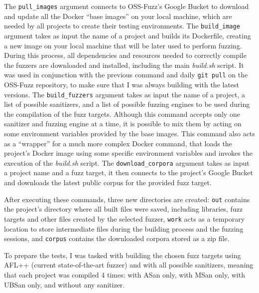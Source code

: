 The \verb|pull_images| argument connects to OSS-Fuzz's Google Bucket to download and update all the Docker ``base images'' on your local machine, which are needed by all projects to create their testing environments.
The \verb|build_image| argument takes as input the name of a project and builds its Dockerfile, creating a new image on your local machine that will be later used to perform fuzzing. During this process, all dependencies and resources needed to correctly compile the fuzzers are downloaded and installed, including the main \textit{build.sh} script. It was used in conjunction with the previous command and daily \verb|git pull| on the OSS-Fuzz repository, to make sure that I was always building with the latest versions. 
The \verb|build_fuzzers| argument takes as input the name of a project, a list of possible sanitizers, and a list of possible fuzzing engines to be used during the compilation of the fuzz targets. Although this command accepts only one sanitizer and fuzzing engine at a time, it is possible to mix them by acting on some environment variables provided by the base images. This command also acts as a ``wrapper'' for a much more complex Docker command, that loads the project's Docker image using some specific environment variables and invokes the execution of the \textit{build.sh} script.
The \verb|download_corpora| argument takes as input a project name and a fuzz target, it then connects to the project's Google Bucket and downloads the latest public corpus for the provided fuzz target.

After executing these commands, three new directories are created: \verb|out| contains the project's directory where all built files were saved, including libraries, fuzz targets and other files created by the selected fuzzer, \verb|work| acts as a temporary location to store intermediate files during the building process and the fuzzing sessions, and \verb|corpus| contains the downloaded corpora stored as a zip file.

To prepare the tests, I was tasked with building the chosen fuzz targets using AFL++ (current state-of-the-art fuzzer) and with all possible sanitizers, meaning that each project was compiled 4 times: with ASan only, with MSan only, with UBSan only, and without any sanitizer.

